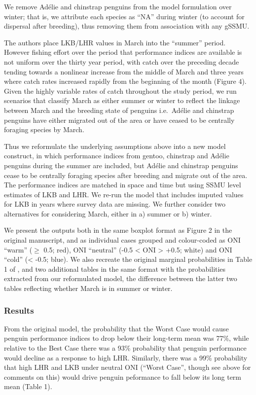 \documentclass[]{elsarticle} %
\begin{document}
We remove Adélie and chinstrap penguins from the model formulation over
winter; that is, we attribute each species as ``NA'' during winter (to
account for dispersal after breeding), thus removing them from
association with any gSSMU.

The authors place LKB/LHR values in March into the ``summer'' period.
However fishing effort over the period that performance indices are
available is not uniform over the thirty year period, with catch over
the preceding decade tending towards a nonlinear increase from the
middle of March and three years where catch rates increased rapidly from
the beginning of the month (Figure 4). Given the highly variable rates
of catch throughout the study period, we run scenarios that classify
March as either summer or winter to reflect the linkage between March
and the breeding state of penguins i.e.~Adélie and chinstrap penguins
have either migrated out of the area or have ceased to be centrally
foraging species by March.

Thus we reformulate the underlying assumptions above into a new model
construct, in which performance indices from gentoo, chinstrap and
Adélie penguins during the summer are included, but Adélie and chinstrap
penguins cease to be centrally foraging species after breeding and
migrate out of the area. The performance indices are matched in space
and time but using SSMU level estimates of LKB and LHR. We re-run the
model that includes imputed values for LKB in years where survey data
are missing. We further consider two alternatives for considering March,
either in a) summer or b) winter.

We present the outputs both in the same boxplot format as Figure 2 in
the original manuscript, and as individual cases grouped and
colour-coded as ONI ``warm'' (\(\geqslant\) 0.5; red), ONI ``neutral''
(-0.5 \textless{} ONI \textgreater{} +0.5; white) and ONI ``cold''
(\textless{} -0.5; blue). We also recreate the original marginal
probabilities in Table 1 of \citet{Watters2020}, and two additional
tables in the same format with the probabilities extracted from our
reformulated model, the difference between the latter two tables
reflecting whether March is in summer or winter.

\subsubsection{Results}\label{results}

From the original \citet{Watters2020} model, the probability that the
Worst Case would cause penguin performance indices to drop below their
long-term mean was 77\%, while relative to the Best Case there was a
93\% probability that penguin performance would decline as a response to
high LHR. Similarly, there was a 99\% probability that high LHR and LKB
under neutral ONI (``Worst Case'', though see above for comments on
this) would drive penguin peformance to fall below its long term mean
(Table 1).
\end{document}
